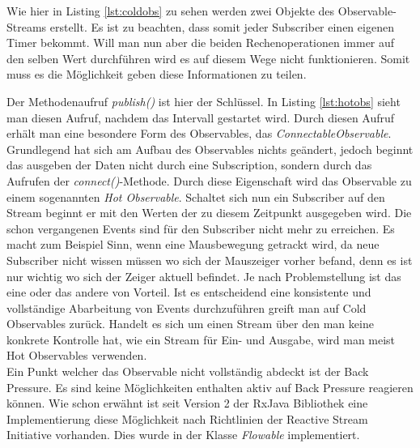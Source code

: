 
Wie hier in Listing \ref{lst:coldobs} zu sehen werden zwei Objekte des Observable-Streams erstellt. Es ist zu beachten, dass somit jeder Subscriber einen eigenen Timer bekommt. Will man nun aber die beiden Rechenoperationen immer auf den selben Wert durchführen wird es auf diesem Wege nicht funktionieren. Somit muss es die Möglichkeit geben diese Informationen zu teilen.

Der Methodenaufruf \textit{publish()} ist hier der Schlüssel. In Listing \ref{lst:hotobs} sieht man diesen Aufruf, nachdem das Intervall gestartet wird. Durch diesen Aufruf erhält man eine besondere Form des Observables, das \textit{ConnectableObservable}. Grundlegend hat sich am Aufbau des Observables nichts geändert, jedoch beginnt das ausgeben der Daten nicht durch eine Subscription, sondern durch das Aufrufen der \textit{connect()}-Methode. Durch diese Eigenschaft wird das Observable zu einem sogenannten \textit{Hot Observable}. Schaltet sich nun ein Subscriber auf den Stream beginnt er mit den Werten der zu diesem Zeitpunkt ausgegeben wird. Die schon vergangenen Events sind für den Subscriber nicht mehr zu erreichen. Es macht zum Beispiel Sinn, wenn eine Mausbewegung getrackt wird, da neue Subscriber nicht wissen müssen wo sich der Mauszeiger vorher befand, denn es ist nur wichtig wo sich der Zeiger aktuell befindet. Je nach Problemstellung ist das eine oder das andere von Vorteil. Ist es entscheidend eine konsistente und vollständige Abarbeitung von Events durchzuführen greift man auf Cold Observables zurück. Handelt es sich um einen Stream über den man keine konkrete Kontrolle hat, wie ein Stream für Ein- und Ausgabe, wird man meist Hot Observables verwenden. \\ Ein Punkt welcher das Observable nicht vollständig abdeckt ist der Back Pressure. Es sind keine Möglichkeiten enthalten aktiv auf Back Pressure reagieren können. Wie schon erwähnt ist seit Version 2 der RxJava Bibliothek eine Implementierung diese Möglichkeit nach Richtlinien der Reactive Stream Initiative vorhanden. Dies wurde in der Klasse \textit{Flowable} implementiert.
